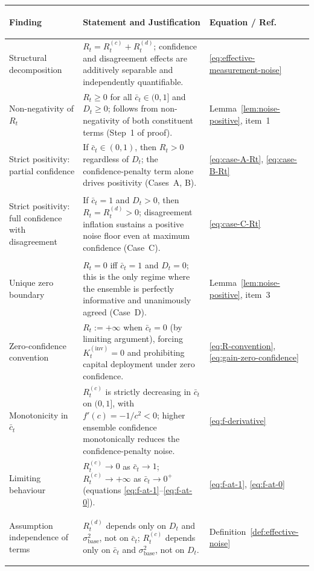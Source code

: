 \documentclass[12pt,openany]{book}
\numberwithin{equation}{chapter}
\theoremstyle{plain}
\theoremstyle{definition}
\theoremstyle{remark}
\renewcommand{\arraystretch}{1.2}
\begin{document}
\begin{center}
\renewcommand{\arraystretch}{1.45}
\begin{tabularx}{\linewidth}{>{\bfseries\raggedright\arraybackslash}p{3.2cm}
                              >{\raggedright\arraybackslash}X
                              >{\centering\arraybackslash}p{2.8cm}}
\hline
\textbf{Finding} & \textbf{Statement and Justification}
  & \textbf{Equation / Ref.} \\
\hline
Structural decomposition
  & $R_t = R_t^{(c)} + R_t^{(d)}$; confidence and
    disagreement effects are additively separable and
    independently quantifiable.
  & \eqref{eq:effective-measurement-noise} \\
\hline
Non-negativity of $R_t$
  & $R_t \geq 0$ for all $\bar{c}_t \in (0,1]$ and
    $D_t \geq 0$; follows from non-negativity of both
    constituent terms (Step~1 of proof).
  & Lemma~\ref{lem:noise-positive}, item~1 \\
\hline
Strict positivity: partial confidence
  & If $\bar{c}_t \in (0,1)$, then $R_t > 0$
    regardless of $D_t$; the confidence-penalty term
    alone drives positivity (Cases~A, B).
  & \eqref{eq:case-A-Rt}, \eqref{eq:case-B-Rt} \\
\hline
Strict positivity: full confidence with disagreement
  & If $\bar{c}_t = 1$ and $D_t > 0$, then
    $R_t = R_t^{(d)} > 0$; disagreement inflation
    sustains a positive noise floor even at maximum
    confidence (Case~C).
  & \eqref{eq:case-C-Rt} \\
\hline
Unique zero boundary
  & $R_t = 0$ iff $\bar{c}_t = 1$ and $D_t = 0$;
    this is the only regime where the ensemble is
    perfectly informative and unanimously agreed (Case~D).
  & Lemma~\ref{lem:noise-positive}, item~3 \\
\hline
Zero-confidence convention
  & $R_t := +\infty$ when $\bar{c}_t = 0$ (by limiting
    argument), forcing $K_t^{(\mathrm{inv})} = 0$ and
    prohibiting capital deployment under zero confidence.
  & \eqref{eq:R-convention},
    \eqref{eq:gain-zero-confidence} \\
\hline
Monotonicity in $\bar{c}_t$
  & $R_t^{(c)}$ is strictly decreasing in $\bar{c}_t$
    on $(0,1]$, with
    $f'(c) = -1/c^2 < 0$; higher ensemble confidence
    monotonically reduces the confidence-penalty noise.
  & \eqref{eq:f-derivative} \\
\hline
Limiting behaviour
  & $R_t^{(c)} \to 0$ as $\bar{c}_t \to 1$;
    $R_t^{(c)} \to +\infty$ as $\bar{c}_t \to 0^+$
    (equations \eqref{eq:f-at-1}--\eqref{eq:f-at-0}).
  & \eqref{eq:f-at-1}, \eqref{eq:f-at-0} \\
\hline
Assumption independence of terms
  & $R_t^{(d)}$ depends only on $D_t$ and
    $\sigma_{\mathrm{base}}^2$, not on $\bar{c}_t$;
    $R_t^{(c)}$ depends only on $\bar{c}_t$ and
    $\sigma_{\mathrm{base}}^2$, not on $D_t$.
  & Definition~\ref{def:effective-noise} \\
\hline
\end{tabularx}
\end{center}
\end{document}
